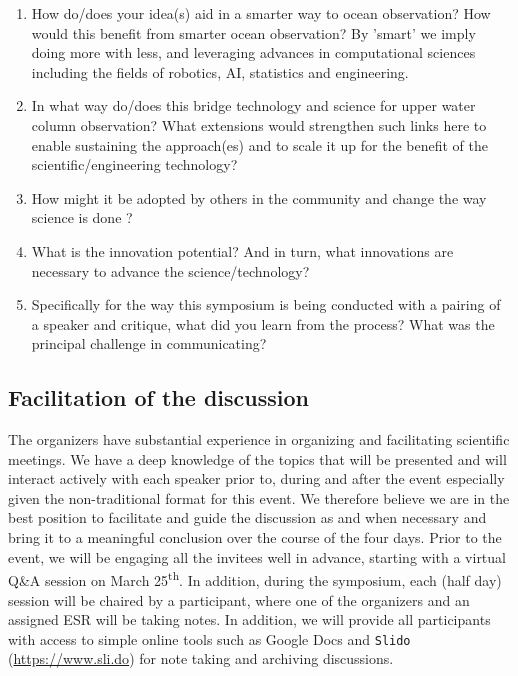 \begin{enumerate}

\item How do/does your idea(s) aid in a smarter way to ocean
  observation? How would this benefit from smarter ocean observation? By
  'smart' we imply doing more with less, and leveraging advances in
  computational sciences including the fields of robotics, AI,
  statistics and engineering.

\item In what way do/does this bridge technology and science for upper
  water column observation? What extensions would strengthen such links
  here to enable sustaining the approach(es) and to scale it up for the
  benefit of the scientific/engineering technology?

\item How might it be adopted by others in the community and change the
  way science is done ?

\item What is the innovation potential? And in turn, what innovations
  are necessary to advance the science/technology?

\item Specifically for the way this symposium is being conducted with a
  pairing of a speaker and critique, what did you learn from the
  process? What was the principal challenge in communicating?

\end{enumerate}

\subsection{Facilitation of the discussion}

The organizers have substantial experience in organizing and
facilitating scientific meetings. We have a deep knowledge of the
topics that will be presented and will interact actively with each
speaker prior to, during and after the event especially given the
non-traditional format for this event. We therefore believe we are in
the best position to facilitate and guide the discussion as and when
necessary and bring it to a meaningful conclusion over the course of
the four days. Prior to the event, we will be engaging all the
invitees well in advance, starting with a virtual Q\&A session on
March 25\textsuperscript{th}. In addition, during the symposium, each
(half day) session will be chaired by a participant, where one of the
organizers and an assigned ESR will be taking notes. In addition, we
will provide all participants with access to simple online tools
such as Google Docs and \texttt{Slido} (\url{https://www.sli.do}) for
note taking and archiving discussions. 


